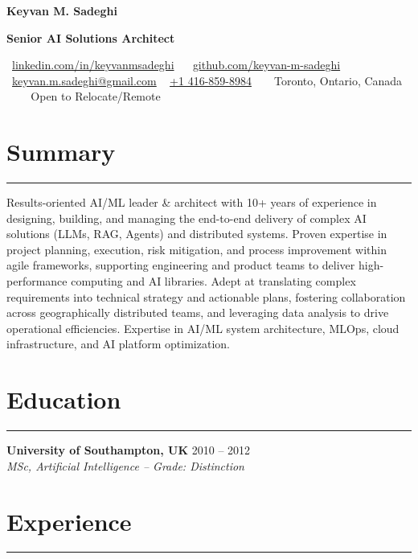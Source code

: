 \documentclass[10pt, a4paper]{article} %
\makeatletter
\newcommand{\contactinfo}{
    \vspace{-0.15in}
    \begin{center}
    \footnotesize %
    \faLinkedin~\href{https://linkedin.com/in/keyvanmsadeghi}{linkedin.com/in/keyvanmsadeghi} ~
    \faGithub~\href{https://github.com/keyvan-m-sadeghi}{github.com/keyvan-m-sadeghi} ~
    \faEnvelope~\href{mailto:keyvan.m.sadeghi@gmail.com}{keyvan.m.sadeghi@gmail.com} ~
    \faPhone\href{tel:+14168598984}{+1 416-859-8984} ~
    \faMapMarker ~ Toronto, Ontario, Canada ~~
    \faPlane ~ Open to Relocate/Remote
    \end{center}
    \vspace{-0.1in} %
}
\makeatother
\begin{document}
\pagestyle{empty} %

\begin{center}
    \LARGE\textbf{Keyvan M. Sadeghi}
\end{center}
\vspace{-0.15in}
\begin{center}
    \fontsize{11}{13}\selectfont \textbf{Senior AI Solutions Architect} %
\end{center}
\contactinfo

\section*{Summary}
\vspace{-4pt}\rule{\textwidth}{0.4pt}\vspace{2pt} %
\small{ %
Results-oriented AI/ML leader \& architect with 10+ years of experience in designing, building, and managing the end-to-end delivery of complex AI solutions (LLMs, RAG, Agents) and distributed systems.
Proven expertise in project planning, execution, risk mitigation, and process improvement within agile frameworks, supporting engineering and product teams to deliver high-performance computing and AI libraries.
Adept at translating complex requirements into technical strategy and actionable plans, fostering collaboration across geographically distributed teams, and leveraging data analysis to drive operational efficiencies.
Expertise in AI/ML system architecture, MLOps, cloud infrastructure, and AI platform optimization.
}
\vspace{3pt} %

\section*{Education}
\vspace{-4pt}\rule{\textwidth}{0.4pt}\vspace{2pt} %

\noindent\textbf{University of Southampton, UK} \hfill \small{2010 – 2012} \\
\noindent \textit{MSc, Artificial Intelligence – Grade: Distinction}
\vspace{3pt} %

\section*{Experience}
\vspace{-4pt}\rule{\textwidth}{0.4pt}\vspace{2pt} %
\end{document}
